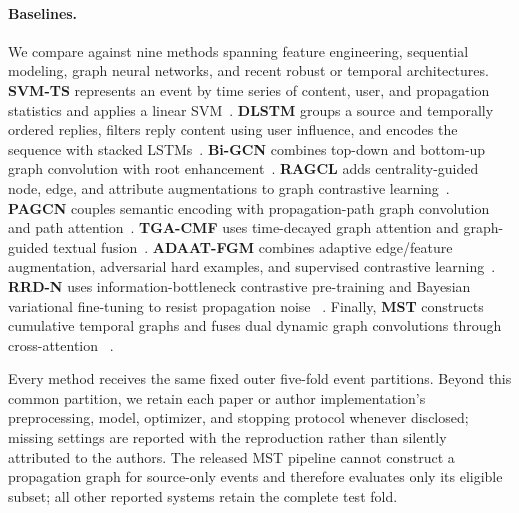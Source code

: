 \documentclass[sigconf,anonymous,review]{../acmart/acmart}
\begin{document}
\paragraph{Baselines.}
We compare against nine methods spanning feature engineering, sequential
modeling, graph neural networks, and recent robust or temporal architectures.
\textbf{SVM-TS} represents an event by time series of content, user, and
propagation statistics and applies a linear SVM~\cite{ma2015svmts}.
\textbf{DLSTM} groups a source and temporally ordered replies, filters reply
content using user influence, and encodes the sequence with stacked
LSTMs~\cite{xu2019dlstm}.  \textbf{Bi-GCN} combines top-down and bottom-up
graph convolution with root enhancement~\cite{bian2020bigcn}.
\textbf{RAGCL} adds centrality-guided node, edge, and attribute augmentations
to graph contrastive learning~\cite{cui2024ragcl}.  \textbf{PAGCN} couples
semantic encoding with propagation-path graph convolution and path
attention~\cite{liu2025pagcn}.  \textbf{TGA-CMF} uses time-decayed graph
attention and graph-guided textual fusion~\cite{ding2026tgacmf}.
\textbf{ADAAT-FGM} combines adaptive edge/feature augmentation, adversarial
hard examples, and supervised contrastive learning~\cite{wang2025adaat}.
\textbf{RRD-N} uses information-bottleneck contrastive pre-training and
Bayesian variational fine-tuning to resist propagation noise
~\cite{zhang2026rrdn}.  Finally, \textbf{MST} constructs cumulative temporal
graphs and fuses dual dynamic graph convolutions through cross-attention
~\cite{huang2025mst}.

Every method receives the same fixed outer five-fold event partitions.
Beyond this common partition, we retain each paper or author implementation's
preprocessing, model, optimizer, and stopping protocol whenever disclosed;
missing settings are reported with the reproduction rather than silently
attributed to the authors.  The released MST pipeline cannot construct a
propagation graph for source-only events and therefore evaluates only its
eligible subset; all other reported systems retain the complete test fold.
\end{document}
